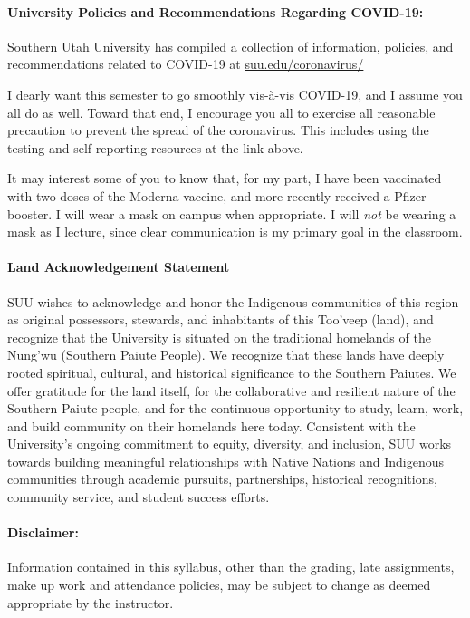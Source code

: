 \documentclass[12pt, letterpaper]{article}
\begin{document}
\paragraph{University Policies and Recommendations Regarding COVID-19:}
Southern Utah University has compiled a collection of information, policies, and recommendations related to COVID-19 at \href{https://www.suu.edu/coronavirus/}{suu.edu/coronavirus/}

\noindent I dearly want this semester to go smoothly vis-\`a-vis COVID-19, and I assume you all do as well. Toward that end, I encourage you all to exercise all reasonable precaution to prevent the spread of the coronavirus. This includes using the testing and self-reporting resources at the link above.

\noindent It may interest some of you to know that, for my part, I have been vaccinated with two doses of the Moderna vaccine, and more recently received a Pfizer booster. I will wear a mask on campus when appropriate. I will \emph{not} be wearing a mask as I lecture, since clear communication is my primary goal in the classroom.

\paragraph{Land Acknowledgement Statement}
SUU wishes to acknowledge and honor the Indigenous communities of this region as original possessors, stewards, and inhabitants of this Too’veep (land), and recognize that the University is situated on the traditional homelands of the Nung’wu (Southern Paiute People). We recognize that these lands have deeply rooted spiritual, cultural, and historical significance to the Southern Paiutes. We offer gratitude for the land itself, for the collaborative and resilient nature of the Southern Paiute people, and for the continuous opportunity to study, learn, work, and build community on their homelands here today. Consistent with the University's ongoing commitment to equity, diversity, and inclusion, SUU works towards building meaningful relationships with Native Nations and Indigenous communities through academic pursuits, partnerships, historical recognitions, community service, and student success efforts.

\paragraph{Disclaimer:}
Information contained in this syllabus, other than the grading, late assignments, make up work and attendance policies, may be subject to change as deemed appropriate by the instructor.
\end{document}

